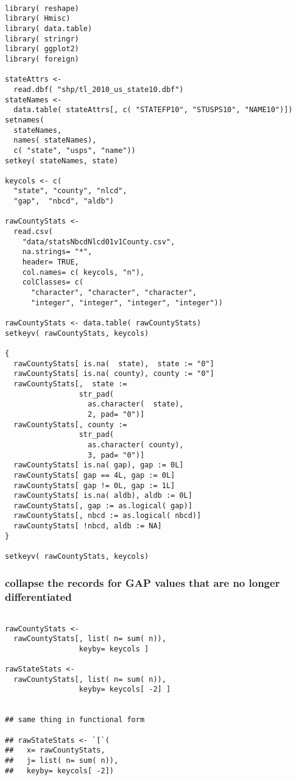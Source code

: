\documentclass[11pt]{article}
\begin{document}
\begin{verbatim}

library( reshape)
library( Hmisc)
library( data.table)
library( stringr)
library( ggplot2)
library( foreign)

stateAttrs <-
  read.dbf( "shp/tl_2010_us_state10.dbf")
stateNames <-
  data.table( stateAttrs[, c( "STATEFP10", "STUSPS10", "NAME10")])
setnames(
  stateNames,
  names( stateNames),
  c( "state", "usps", "name"))
setkey( stateNames, state)

keycols <- c(
  "state", "county", "nlcd", 
  "gap",  "nbcd", "aldb")

rawCountyStats <-
  read.csv(
    "data/statsNbcdNlcd01v1County.csv",
    na.strings= "*",
    header= TRUE,
    col.names= c( keycols, "n"),
    colClasses= c(
      "character", "character", "character",
      "integer", "integer", "integer", "integer"))

rawCountyStats <- data.table( rawCountyStats)
setkeyv( rawCountyStats, keycols)

{
  rawCountyStats[ is.na(  state),  state := "0"]
  rawCountyStats[ is.na( county), county := "0"]
  rawCountyStats[,  state :=
                 str_pad(
                   as.character(  state),
                   2, pad= "0")]
  rawCountyStats[, county :=
                 str_pad(
                   as.character( county),
                   3, pad= "0")]
  rawCountyStats[ is.na( gap), gap := 0L]
  rawCountyStats[ gap == 4L, gap := 0L]
  rawCountyStats[ gap != 0L, gap := 1L]
  rawCountyStats[ is.na( aldb), aldb := 0L]
  rawCountyStats[, gap := as.logical( gap)]
  rawCountyStats[, nbcd := as.logical( nbcd)]
  rawCountyStats[ !nbcd, aldb := NA]
}

setkeyv( rawCountyStats, keycols)
\end{verbatim}
\subsubsection{collapse the records for GAP values that are no longer differentiated}
\label{sec-3-5-3}




\begin{verbatim}

rawCountyStats <-
  rawCountyStats[, list( n= sum( n)),
                 keyby= keycols ]

rawStateStats <- 
  rawCountyStats[, list( n= sum( n)),
                 keyby= keycols[ -2] ]


## same thing in functional form

## rawStateStats <- `[`(
##   x= rawCountyStats,
##   j= list( n= sum( n)),
##   keyby= keycols[ -2])
\end{verbatim}
\end{document}
